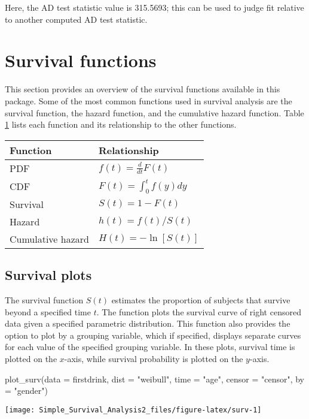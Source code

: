 Here, the AD test statistic value is 315.5693; this can be used to judge
fit relative to another computed AD test statistic.

\hypertarget{survival-functions}{%
\section{Survival functions}\label{survival-functions}}

This section provides an overview of the survival functions available in
this package. Some of the most common functions used in survival
analysis are the survival function, the hazard function, and the
cumulative hazard function. Table \ref{table:functions} lists each
function and its relationship to the other functions.

\begin{table}
\begin{tabular}{ll}
\hline
Function & Relationship  \\
\hline
PDF & ${f(t)=\frac{d}{dt}F(t)}$\\
CDF  & ${F(t)=\int_0^t f(y)dy}$\\
Survival & ${S(t)=1-F(t)}$ \\
Hazard & ${h(t)=f(t)/S(t)}$ \\
Cumulative hazard & ${H(t)=-\ln[S(t)]}$\\
\hline
\end{tabular}
\label{table:functions}
\end{table}

\hypertarget{survival-plots}{%
\subsection{Survival plots}\label{survival-plots}}

The survival function \(S(t)\) estimates the proportion of subjects that
survive beyond a specified time \(t\). The  function
plots the survival curve of right censored data given a specified
parametric distribution. This function also provides the option to plot
by a grouping variable, which if specified, displays separate curves for
each value of the specified grouping variable. In these plots, survival
time is plotted on the \(x\)-axis, while survival probability is plotted
on the \(y\)-axis.

\begin{Schunk}
\begin{Sinput}
plot_surv(data = firstdrink, dist = "weibull", time = "age", censor = "censor", by = "gender")
\end{Sinput}

\texttt{[image: Simple\_Survival\_Analysis2\_files/figure-latex/surv-1]} \end{Schunk}

